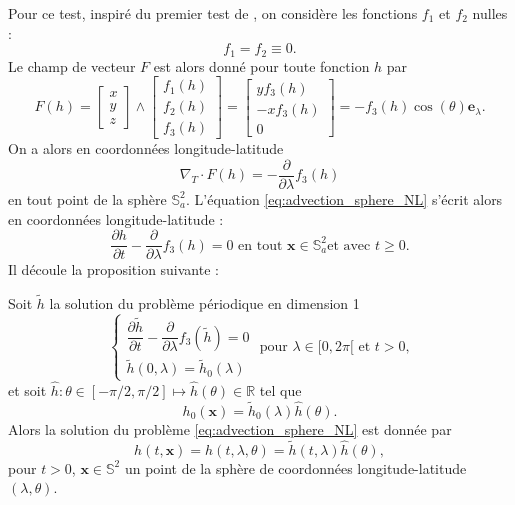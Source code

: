 Pour ce test, inspiré du premier test de \cite{BenArtzi2009}, on considère les fonctions $f_1$ et $f_2$ nulles :
\begin{equation}
f_1 = f_2 \equiv 0.
\end{equation}
Le champ de vecteur $F$ est alors donné pour toute fonction $h$ par
\begin{equation}
F(h) = \begin{bmatrix}
x \\ y \\z
\end{bmatrix}
\wedge
\begin{bmatrix}
f_1(h) \\ f_2(h) \\ f_3(h)
\end{bmatrix} = \begin{bmatrix}
y f_3 (h) \\ -x f_3(h) \\ 0
\end{bmatrix} = -f_3(h) \cos (\theta) \mathbf{e}_{\lambda}.
\end{equation}
On a alors en coordonnées longitude-latitude
\begin{equation}
\nabla_T \cdot F(h) = - \dfrac{\partial}{\partial \lambda} f_3(h)
\end{equation}
en tout point de la sphère $\mathbb{S}^2_a$.
L'équation \eqref{eq:advection_sphere_NL} s'écrit alors en coordonnées longitude-latitude :
\begin{equation}
\dfrac{\partial h}{\partial t} - \dfrac{\partial}{\partial \lambda}f_3(h) = 0 \text{ en tout } \mathbf{x} \in \mathbb{S}^2_a \text{et avec } t \geq 0.
\end{equation}
Il découle la proposition suivante :
\begin{proposition}
Soit $\tilde{h}$ la solution du problème périodique en dimension 1
\begin{equation}
\left\lbrace
\begin{array}{rcl}
\dfrac{\partial \tilde{h}}{\partial t} - \dfrac{\partial}{\partial \lambda}f_3(\tilde{h}) = 0 \\
\tilde{h}(0,\lambda) = \tilde{h}_0(\lambda) 
\end{array}
\right. \text{ pour } \lambda \in [0, 2 \pi[ \text{ et } t > 0,
\label{eq:conservation_sph_burgers}
\end{equation}
et soit $\hat{h} : \theta \in [- \pi/2, \pi/2] \mapsto \hat{h}(\theta) \in \mathbb{R}$ tel que
\begin{equation}
h_0(\mathbf{x}) = \tilde{h}_0(\lambda) \hat{h}(\theta).
\end{equation}
Alors la solution du problème \eqref{eq:advection_sphere_NL} est donnée par
\begin{equation}
h(t,\mathbf{x}) = h(t,\lambda, \theta) = \tilde{h}(t,\lambda) \hat{h}(\theta),
\end{equation}
pour $t>0$, $\mathbf{x} \in \mathbb{S}^2$ un point de la sphère de coordonnées longitude-latitude $(\lambda, \theta)$.
\end{proposition}

